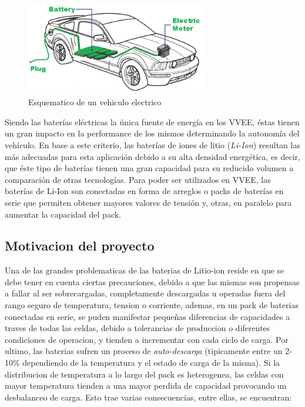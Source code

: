 \documentclass[10pt,a4paper]{article}
\begin{document}
    \begin{figure}[h!]
        \begin{center}
            \includegraphics[width=0.7\textwidth]{EV.png}
            \caption{Esquematico de un vehiculo electrico}
            \label{EV}
        \end{center}
    \end{figure}

	\noindent Siendo las baterías eléctricas la única fuente de energía en los 
    \acrfull{VVEE}, éstas tienen un gran impacto en la performance de los mismos 
    determinando la autonomía del vehículo. En base a este criterio, las 
    baterías de iones de litio (\emph{Li-Ion}) resultan las más adecuadas para 
    esta aplicación debido a su alta densidad energética, es decir, que éste 
    tipo de baterías tienen una gran capacidad para su reducido volumen a 
    comparación de otras tecnologías. Para poder ser utilizados en
    \acrshort{VVEE}, las baterías de Li-Ion son conectadas en forma de arreglos 
    o packs de baterías en serie que permiten obtener mayores valores de tensión
     y, otras, en paralelo para aumentar la capacidad del pack.

    \subsection{Motivacion del proyecto}
	
	\noindent Una de las grandes problematicas de las baterias de Litio-ion 
    reside en que se debe tener en cuenta ciertas precauciones,
    debido a que las mismas son propensas a fallar al ser sobrecargadas, 
    completamente descargadas u operadas fuera del
    rango seguro de temperatura, tension o corriente, ademas, en un pack de 
    baterias conectadas en serie, se puden manifestar pequeñas diferencias de 
    capacidades a traves de todas las celdas, debido a tolerancias de
    produccion o diferentes condiciones de operacion, y tienden
    a incrementar con cada ciclo de carga. Por ultimo, las baterias
    sufren un proceso de \emph{auto-descarga} (tipicamente entre un
    2-10\% dependiendo de la temperatura y el estado de carga de la misma). 
    Si la distribucion de temperatura a lo largo del pack es
    heterogenea, las celdas con mayor temperatura tienden a una mayor
    perdida de capacidad provocando un desbalanceo de carga.
    Esto trae varias consecuencias, entre ellas, se encuentran:
\end{document}
